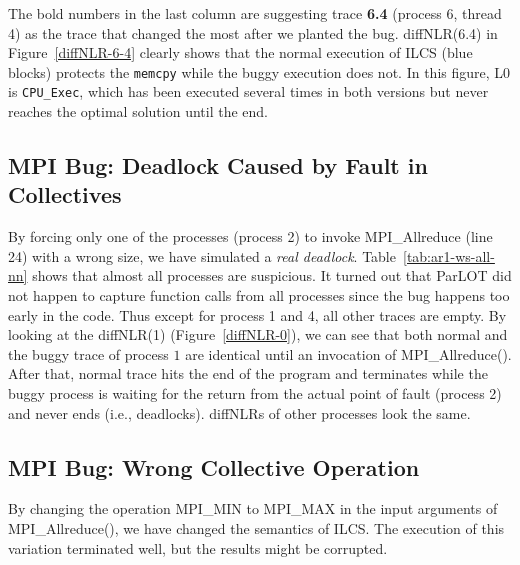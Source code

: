 The bold numbers in the last column are suggesting trace \textbf{6.4} (process 6, thread 4) as the trace that changed the most after we planted the bug.
%
diffNLR(6.4) in Figure~\ref{diffNLR-6-4} clearly shows that the normal execution of ILCS (blue blocks) protects the \texttt{memcpy} while the buggy execution does not. In this figure, L0 is \texttt{CPU\_Exec}, which has been executed several times in both versions but never reaches the optimal solution until the end.
%





\subsection{MPI Bug: Deadlock Caused by Fault in Collectives}
By forcing only one of the processes (process 2) to invoke MPI\_Allreduce (line 24) with a wrong size, we have simulated a \textit{real deadlock}. 
%
Table~\ref{tab:ar1-ws-all-nn} shows that almost all processes are suspicious.
%
It turned out that ParLOT did not happen to capture function calls from all processes since the bug happens too early in the code. Thus except for process 1 and 4, all other traces are empty.
%
By looking at the diffNLR(1) (Figure~\ref{diffNLR-0}), we can see that both normal and the buggy trace of process $1$ are identical until an invocation of MPI\_Allreduce(). After that, normal trace hits the end of the program and terminates while the buggy process is waiting for the return from the actual point of fault (process 2) and never ends (i.e., deadlocks). 
%
diffNLRs of other processes look the same.
%

%

%





\subsection{MPI Bug: Wrong Collective Operation}
By changing the operation MPI\_MIN to MPI\_MAX in the input arguments of MPI\_Allreduce(), we have changed the semantics of ILCS. 
%
The execution of this variation terminated well, but the results might be corrupted.
%

